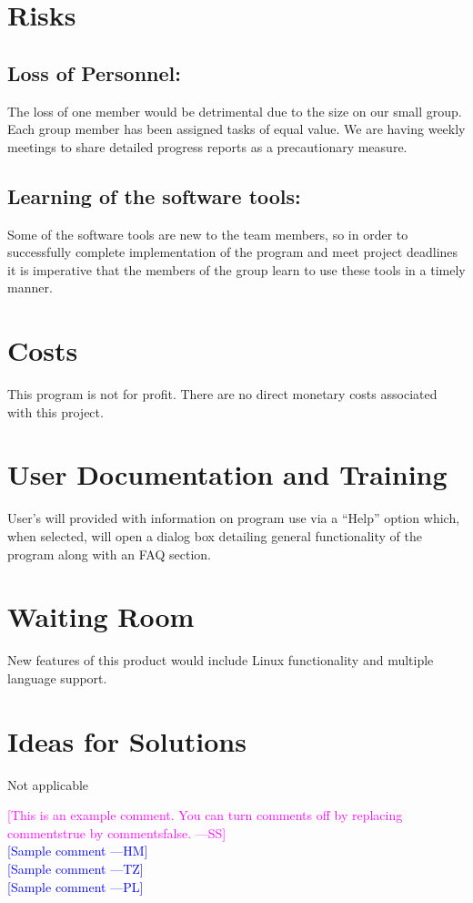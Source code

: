 \documentclass[titlepage]{article}
\newcommand{\authornote}[3]{\textcolor{#1}{[#3 ---#2]}}
\newcommand{\authornote}[3]{}
\newcommand{\wss}[1]{\authornote{magenta}{SS}{#1}}
\newcommand{\hm}[1]{\authornote{blue}{HM}{#1}} %
\newcommand{\tz}[1]{\authornote{blue}{TZ}{#1}} %
\newcommand{\pl}[1]{\authornote{blue}{PL}{#1}} %
\begin{document}
\section{Risks }

\subsection*{Loss of Personnel:}The loss of one member would be detrimental due to the size on our small group. Each group member has been assigned tasks of equal value. We are having weekly meetings to share detailed progress reports as a precautionary measure. 

\subsection*{Learning of the software tools:} Some of the software tools are new to the team members, so in order to successfully complete implementation of the program and meet project deadlines it is imperative that the members of the group learn to use these tools in a timely manner.

\section{Costs }
This program is not for profit. There are no direct monetary costs associated with this project.

\section{User Documentation and Training }
User’s will provided with information on program use via a “Help” option which, when selected, will
open a dialog box detailing general functionality of the program along with an FAQ section.

\section{Waiting Room}
New features of this product would include Linux functionality and multiple language support.

\section{Ideas for Solutions}
Not applicable



\noindent \wss{This is an example comment.  You can turn comments off by replacing
  commentstrue by commentsfalse.}\\
\hm{Sample comment}\\
\tz{Sample comment}\\
\pl{Sample comment}
\end{document}
